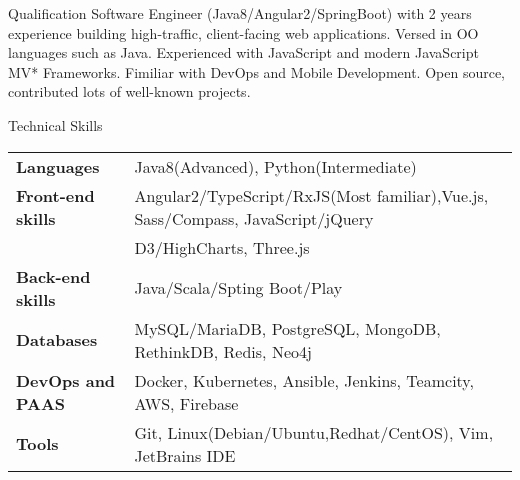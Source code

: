 \documentclass{resume} %
\date{\specialdate\today}
\begin{document}


\begin{rSection}{Qualification}
Software Engineer (Java8/Angular2/SpringBoot) with 2 years experience building high-traffic, client-facing web applications. Versed in OO languages such as Java. Experienced with JavaScript and modern JavaScript MV* Frameworks. Fimiliar with DevOps and Mobile Development. Open source, contributed lots of well-known projects.

\end{rSection}








\begin{rSection}{Technical Skills}

\begin{tabular}{ @{} >{\bfseries}l @{\hspace{6ex}} l }
Languages& Java8(Advanced), Python(Intermediate)\\
Front-end skills & Angular2/TypeScript/RxJS(Most familiar),Vue.js, Sass/Compass, JavaScript/jQuery \\&
  D3/HighCharts, Three.js \\
Back-end skills & Java/Scala/Spting Boot/Play\\
Databases & MySQL/MariaDB, PostgreSQL, MongoDB, RethinkDB, Redis, Neo4j \\
DevOps and PAAS & Docker, Kubernetes, Ansible, Jenkins, Teamcity, AWS, Firebase \\
Tools & Git, Linux(Debian/Ubuntu,Redhat/CentOS), Vim, JetBrains IDE

\end{tabular}

\end{rSection}
\end{document}
